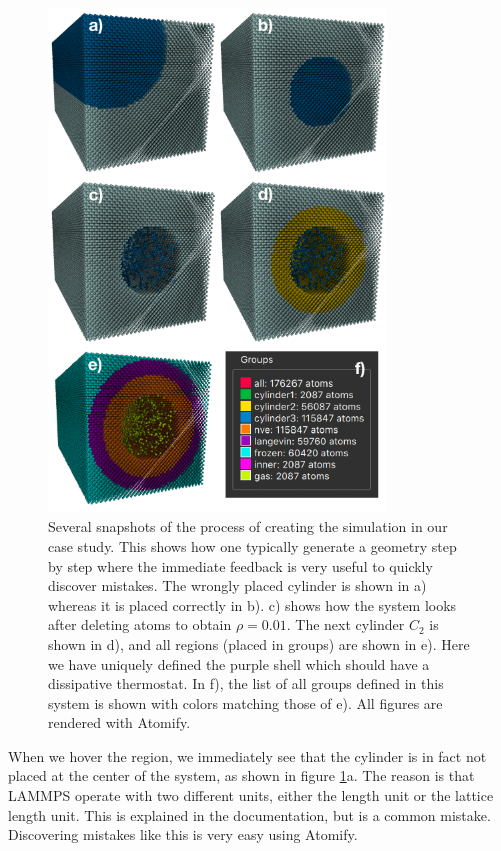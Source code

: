 \documentclass[12pt,a4paper,final]{iopart}
\begin{document}
\begin{figure}
	\centering
	\includegraphics[width=0.8\textwidth]{figures/initial_configuration.pdf}
	\caption{
		Several snapshots of the process of creating the simulation in our case study.
		This shows how one typically generate a geometry step by step where the immediate
		feedback is very useful to quickly discover mistakes.
		The wrongly placed cylinder is shown in a) whereas it is placed correctly in b).
		c) shows how the system looks after deleting atoms to obtain $\rho = 0.01$. The next cylinder $C_2$ is shown in d),
		and all regions (placed in groups) are shown in e). Here we have uniquely defined the purple shell which should have a dissipative thermostat.
		In f), the list of all groups defined in this system is shown with colors matching those of e). All figures are rendered with Atomify.
    }
	\label{fig:initial_configuration}
\end{figure}

When we hover the region, we immediately see that the cylinder is in fact not placed at the center of the system, as shown in figure \ref{fig:initial_configuration}a.
The reason is that LAMMPS operate with two different units, either the length unit or the lattice length unit. This is explained in the documentation, but is a common mistake.
Discovering mistakes like this is very easy using Atomify.
\end{document}
